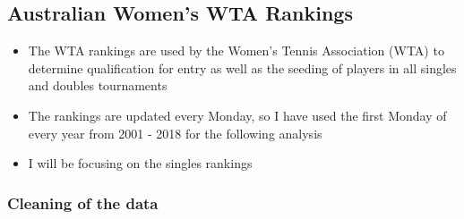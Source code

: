\documentclass[]{article}
\providecommand{\tightlist}{%
  \setlength{\itemsep}{0pt}\setlength{\parskip}{0pt}}
\begin{document}
\subsection{Australian Women's WTA
Rankings}\label{australian-womens-wta-rankings}

\begin{itemize}
\tightlist
\item
  The WTA rankings are used by the Women's Tennis Association (WTA) to
  determine qualification for entry as well as the seeding of players in
  all singles and doubles tournaments
\item
  The rankings are updated every Monday, so I have used the first Monday
  of every year from 2001 - 2018 for the following analysis
\item
  I will be focusing on the singles rankings
\end{itemize}

\subsubsection{Cleaning of the data}\label{cleaning-of-the-data-1}
\end{document}
